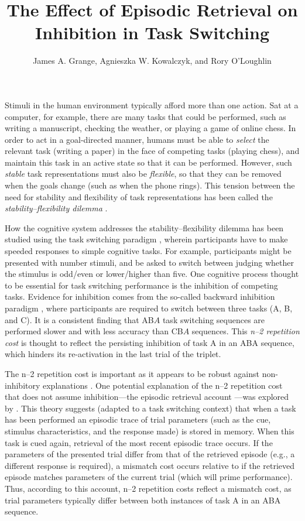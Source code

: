 \documentclass[a4paper, man, natbib]{apa6}
\title{The Effect of Episodic Retrieval on Inhibition in Task Switching}
\author{James A. Grange, Agnieszka W. Kowalczyk, and Rory O'Loughlin}
\affiliation{School of Psychology, Keele University, UK}
\begin{document}
\maketitle

Stimuli in the human environment typically afford more than one action. Sat at a computer, for example, there are many tasks that could be performed, such as writing a manuscript, checking the weather, or playing a game of online chess. In order to act in a goal-directed manner, humans must be able to \emph{select} the relevant task (writing a paper) in the face of competing tasks (playing chess), and maintain this task in an active state so that it can be performed. However, such \emph{stable} task representations must also be \emph{flexible}, so that they can be removed when the goals change (such as when the phone rings). This tension between the need for stability and flexibility of task representations has been called the \emph{stability--flexibility dilemma} \citep{Goschke2000}. 

How the cognitive system addresses the stability--flexibility dilemma has been studied using the task switching paradigm \citep{Grange2014a,Kiesel2010,Vandierendonck2010}, wherein participants have to make speeded responses to simple cognitive tasks. For example, participants might be presented with number stimuli, and be asked to switch between judging whether the stimulus is odd/even or lower/higher than five. One cognitive process thought to be essential for task switching performance is the inhibition of competing tasks. Evidence for inhibition comes from the so-called backward inhibition paradigm \citep{Koch2010, Mayr2000}, where participants are required to switch between three tasks (A, B, and C).  It is a consistent finding that AB$A$ task switching sequences are performed slower and with less accuracy than CB$A$ sequences. This \emph{n--2 repetition cost} is thought to reflect the persisting inhibition of task A in an ABA sequence, which hinders its re-activation in the last trial of the triplet.

The n--2 repetition cost is important as it appears to be robust against non-inhibitory explanations \citep{Mayr2007}. One potential explanation of the n--2 repetition cost that does not assume inhibition---the episodic retrieval account \citep{Neill1997}---was explored by \cite{Mayr2002}. This theory suggests (adapted to a task switching context) that when a task has been performed an episodic trace of trial parameters (such as the cue, stimulus characteristics, and the response made) is stored in memory. When this task is cued again, retrieval of the most recent episodic trace occurs. If the parameters of the presented trial differ from that of the retrieved episode (e.g., a different response is required), a mismatch cost occurs relative to if the retrieved episode matches parameters of the current trial (which will prime performance). Thus, according to this account, n--2 repetition costs reflect a mismatch cost, as trial parameters typically differ between both instances of task A in an ABA sequence.
\end{document}
